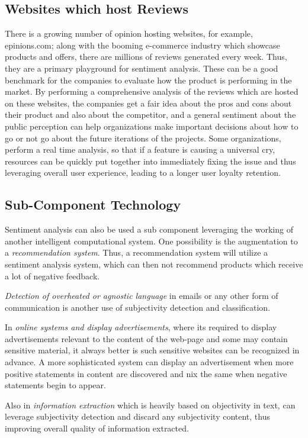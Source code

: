 \subsection{Websites which host Reviews}
There is a growing number of opinion hosting websites, for example, epinions.com; along with the booming e-commerce industry which showcase products and offers, there are millions of reviews generated every week. Thus, they are a primary playground for sentiment analysis. These can be a good benchmark for the companies to evaluate how the product is performing in the market. By performing a comprehensive analysis of the reviews which are hosted on these websites, the companies get a fair idea about the pros and cons about their product and also about the competitor, and a general sentiment about the public perception can help organizations make important decisions about how to go or not go about the future iterations of the projects. Some organizations, perform a real time analysis, so that if a feature is causing a universal cry, resources can be quickly put together into immediately fixing the issue and thus leveraging overall user experience, leading to a longer user loyalty retention.

\subsection{Sub-Component Technology}
Sentiment analysis can also be used a sub component leveraging the working of another intelligent computational system. One possibility is the augmentation to a \textit{recommendation system}. Thus, a recommendation system will utilize a sentiment analysis system, which can then not recommend products which receive a lot of negative feedback.  

\textit{Detection of overheated or agnostic  language} in emails or any other form of communication is another use of subjectivity detection and classification. 

In \textit{online systems and display advertisements}, where its required to display advertisements relevant to the content of the web-page and some may contain sensitive material, it always better is such sensitive websites can be  recognized in advance. A more sophisticated system can display an advertisement when more positive statements in content are discovered and nix the same when negative statements begin to appear. 

Also in \textit{information extraction} which is heavily based on objectivity in text, can leverage subjectivity detection and discard any subjectivity content, thus improving overall quality of information extracted.  


